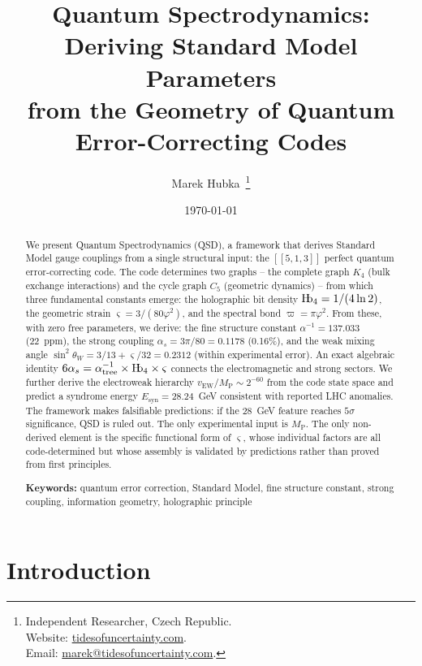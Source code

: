 \documentclass[11pt,a4paper]{article}
\title{
  \textbf{Quantum Spectrodynamics}:\\[0.5em]
  \Large Deriving Standard Model Parameters\\from the Geometry of Quantum Error-Correcting Codes\\[1em]
}
\author{
  Marek Hubka\, \orcidlink{0009-0003-2476-9017}
  \thanks{
    Independent Researcher, Czech Republic.\\
    Website: \href{http://www.tidesofuncertainty.com}{tidesofuncertainty.com}.\\
    Email: \href{mailto:marek@tidesofuncertainty.com}{marek@tidesofuncertainty.com}.
  }
}
\date{\today}
\theoremstyle{definition}
\newcommand{\Hb}{\textnormal{H\kern-0.3em b}}
\newcommand{\Hbfour}{\Hb_4}
\newcommand{\strain}{\varsigma}
\newcommand{\specbond}{\varpi}
\newcommand{\Esyn}{E_{\text{syn}}}
\newcommand{\Mpl}{M_{\mathrm{P}}}
\begin{document}
\maketitle

\begin{abstract}
\noindent We present Quantum Spectrodynamics (QSD), a framework that derives Standard Model gauge couplings from a single structural input: the $[[5,1,3]]$ perfect quantum error-correcting code. The code determines two graphs -- the complete graph $K_4$ (bulk exchange interactions) and the cycle graph $C_5$ (geometric dynamics) -- from which three fundamental constants emerge: the holographic bit density $\Hbfour = 1/(4\ln 2)$, the geometric strain $\strain = 3/(80\varphi^2)$, and the spectral bond $\specbond = \pi\varphi^2$. From these, with zero free parameters, we derive:
the fine structure constant $\alpha^{-1} = 137.033$ (22~ppm),
the strong coupling $\alpha_s = 3\pi/80 = 0.1178$ (0.16\%),
and the weak mixing angle $\sin^2\theta_W = 3/13 + \strain/32 = 0.2312$ (within experimental error).
An exact algebraic identity $6\alpha_s = \alpha^{-1}_{\text{tree}} \times \Hbfour \times \strain$ connects the electromagnetic and strong sectors. We further derive the electroweak hierarchy $v_{\text{EW}}/\Mpl \sim 2^{-60}$ from the code state space and predict a syndrome energy $\Esyn = 28.24$~GeV consistent with reported LHC anomalies. The framework makes falsifiable predictions: if the 28~GeV feature reaches $5\sigma$ significance, QSD is ruled out.
The only experimental input is $\Mpl$. The only non-derived element is the specific functional form of $\strain$, whose individual factors are all code-determined but whose assembly is validated by predictions rather than proved from first principles.

\vspace{0.5em}
\noindent\textbf{Keywords:} quantum error correction, Standard Model, fine structure constant, strong coupling, information geometry, holographic principle
\end{abstract}

\tableofcontents
\newpage

\section{Introduction}
\label{sec:intro}
\end{document}
